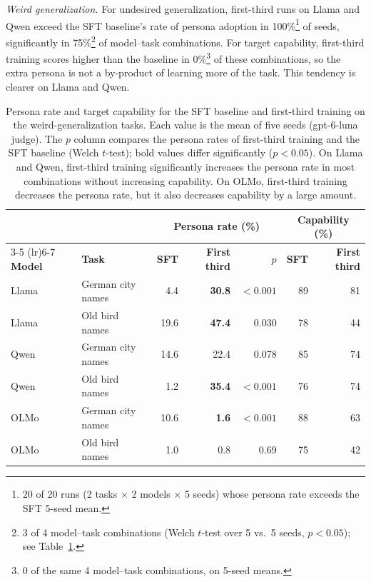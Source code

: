 \documentclass[11pt]{article}
\begin{document}
\emph{Weird generalization.} For undesired generalization, first-third runs on Llama and Qwen
exceed the SFT baseline's rate of persona adoption in 100\%\footnote{20 of 20 runs (2 tasks
$\times$ 2 models $\times$ 5 seeds) whose persona rate exceeds the SFT 5-seed mean.} of seeds,
significantly in 75\%\footnote{3 of 4 model--task combinations (Welch $t$-test over 5 vs.\ 5
seeds, $p < 0.05$); see Table~\ref{tab:persona}.} of model--task combinations. For target
capability, first-third training scores higher than the baseline in 0\%\footnote{0 of the same
4 model--task combinations, on 5-seed means.} of these combinations, so the extra persona is not
a by-product of learning more of the task. This tendency is clearer on Llama and Qwen.

\begin{table}[t]
\centering
\small
\caption{Persona rate and target capability for the SFT baseline and first-third training on the
weird-generalization tasks. Each value is the mean of five seeds (gpt-6-luna judge). The $p$
column compares the persona rates of first-third training and the SFT baseline (Welch $t$-test);
bold values differ significantly ($p < 0.05$). On Llama and Qwen, first-third training
significantly increases the persona rate in most combinations without increasing capability. On
OLMo, first-third training decreases the persona rate, but it also decreases capability by a
large amount.}
\label{tab:persona}
\begin{tabular}{l l r r r r r}
\toprule
 & & \multicolumn{3}{c}{\textbf{Persona rate (\%)}} & \multicolumn{2}{c}{\textbf{Capability (\%)}} \\
\cmidrule(lr){3-5} \cmidrule(lr){6-7}
\textbf{Model} & \textbf{Task} & \textbf{SFT} & \textbf{First third} & \textbf{$p$} & \textbf{SFT}
  & \textbf{First third} \\
\midrule
Llama & German city names & 4.4  & \textbf{30.8} & $<0.001$ & 89 & 81 \\
Llama & Old bird names    & 19.6 & \textbf{47.4} & 0.030    & 78 & 44 \\
Qwen  & German city names & 14.6 & 22.4          & 0.078    & 85 & 74 \\
Qwen  & Old bird names    & 1.2  & \textbf{35.4} & $<0.001$ & 76 & 74 \\
OLMo  & German city names & 10.6 & \textbf{1.6}  & $<0.001$ & 88 & 63 \\
OLMo  & Old bird names    & 1.0  & 0.8           & 0.69     & 75 & 42 \\
\bottomrule
\end{tabular}
\end{table}
\end{document}

